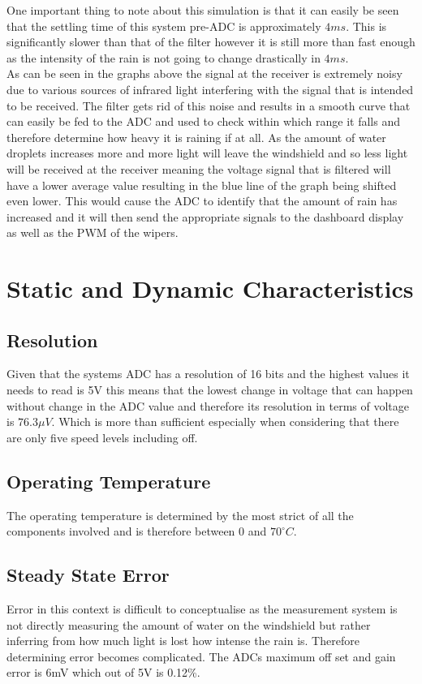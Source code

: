 \documentclass[conference, 11pt]{IEEEtran}
\begin{document}
One important thing to note about this simulation is that it can easily be seen that the settling time of this system pre-ADC is approximately $4ms$. This is significantly slower than that of the filter however it is still more than fast enough as the intensity of the rain is not going to change drastically in $4ms$. \\

As can be seen in the graphs above the signal at the receiver is extremely noisy due to various sources of infrared light interfering with the signal that is intended to be received. The filter gets rid of this noise and results in a smooth curve that can easily be fed to the ADC and used to check within which range it falls and therefore determine how heavy it is raining if at all. As the amount of water droplets increases more and more light will leave the windshield and so less light will be received at the receiver meaning the voltage signal that is filtered will have a lower average value resulting in the blue line of the graph being shifted even lower. This would cause the ADC to identify that the amount of rain has increased and it will then send the appropriate signals to the dashboard display as well as the PWM of the wipers. 


\section{Static and Dynamic Characteristics}

\subsection{Resolution}
Given that the systems ADC has a resolution of 16 bits and the highest values it needs to read is 5V this means that the lowest change in voltage  that can happen without change in the ADC value and therefore its resolution in terms of voltage is $76.3\mu V$. Which  is more than sufficient especially when considering that there are only five speed levels including off. 

\subsection{Operating Temperature}
The operating temperature is determined by the most strict of all the components involved and is therefore between $0$ and $70^{\circ}C$. 

\subsection{Steady State Error}
Error in this context is difficult to conceptualise as the measurement system is not directly measuring the amount of water on the windshield but rather inferring from how much light is lost how intense the rain is. Therefore determining error becomes complicated. The ADCs maximum off set and gain error is 6mV which out of 5V is 0.12\%. 
\end{document}
